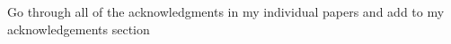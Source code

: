 
Go through all of the acknowledgments in my individual papers and add to my acknowledgements section

\Blindtext[1]